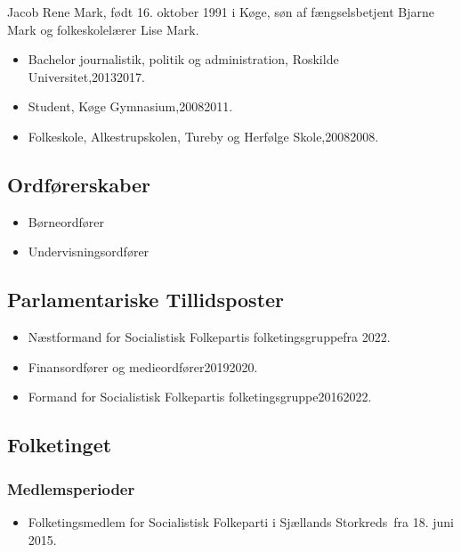 \documentclass[11pt, a4paper]{awesome-cv}
\begin{document}
\makecvheader[R]
\makelettertitle
\begin{cvletter}
Jacob Rene Mark, født 16. oktober 1991 i Køge, søn af fængselsbetjent Bjarne Mark og folkeskolelærer Lise Mark.

\begin{itemize}
\item Bachelor journalistik, politik og administration, Roskilde Universitet,20132017.
\item Student, Køge Gymnasium,20082011.
\item Folkeskole, Alkestrupskolen, Tureby og Herfølge Skole,20082008.
\end{itemize}
\subsection*{Ordførerskaber}
\begin{itemize}
\item Børneordfører
\item Undervisningsordfører
\end{itemize}
\subsection*{Parlamentariske Tillidsposter}
\begin{itemize}
\item Næstformand for Socialistisk Folkepartis folketingsgruppefra 2022.
\item Finansordfører og medieordfører20192020.
\item Formand for Socialistisk Folkepartis folketingsgruppe20162022.
\end{itemize}
\subsection*{Folketinget}
\subsubsection*{Medlemsperioder}
\begin{itemize}
\item Folketingsmedlem for Socialistisk Folkeparti i Sjællands Storkreds fra 18. juni 2015.
\end{itemize}

\end{cvletter}
\end{document}
